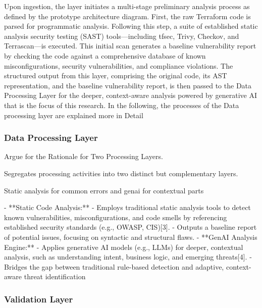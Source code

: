 Upon ingestion, the layer initiates a multi-stage preliminary analysis process as defined by the prototype architecture diagram. First, the raw Terraform code is parsed for programmatic analysis. Following this step, a suite of established static analysis security testing (SAST) tools—including tfsec, Trivy, Checkov, and Terrascan—is executed. This initial scan generates a baseline vulnerability report by checking the code against a comprehensive database of known misconfigurations, security vulnerabilities, and compliance violations. The structured output from this layer, comprising the original code, its AST representation, and the baseline vulnerability report, is then passed to the Data Processing Layer for the deeper, context-aware analysis powered by generative AI that is the focus of this research. In the following, the processes of the Data processing layer are explained more in Detail


\subsubsection{Data Processing Layer} %
\label{sec:Data Processing Layer}

Argue for the Rationale for Two Processing Layers.

Segregates processing activities into two distinct but complementary layers.

Static analysis for common errors and genai for contextual parts

- **Static Code Analysis:**  
    - Employs traditional static analysis tools to detect known vulnerabilities, misconfigurations, and code smells by referencing established security standards (e.g., OWASP, CIS)[3].
    - Outputs a baseline report of potential issues, focusing on syntactic and structural flaws.
  - **GenAI Analysis Engine:**  
    - Applies generative AI models (e.g., LLMs) for deeper, contextual analysis, such as understanding intent, business logic, and emerging threats[4].
    - Bridges the gap between traditional rule-based detection and adaptive, context-aware threat identification


\subsubsection{Validation Layer} %
\label{sec:Validation Layer}

